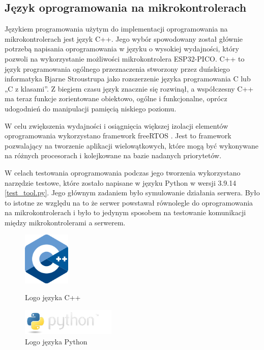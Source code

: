 \documentclass[12pt,oneside,a4paper]{book}
\theoremstyle{break}
\begin{document}
\subsection{Język oprogramowania na mikrokontrolerach}
Językiem programowania użytym do implementacji oprogramowania na mikrokontrolerach
jest język C++. Jego wybór spowodowany został głównie potrzebą napisania oprogramowania
w języku o wysokiej wydajności, który pozwoli na wykorzystanie możliwości mikrokontrolera
ESP32-PICO. C++ to język programowania ogólnego przeznaczenia stworzony przez duńskiego
informatyka Bjarne Stroustrupa jako rozszerzenie języka programowania C lub „C z klasami”. 
Z biegiem czasu język znacznie się rozwinął, a współczesny C++ ma teraz funkcje zorientowane
obiektowo, ogólne i funkcjonalne, oprócz udogodnień do manipulacji pamięcią niskiego poziomu.\\
\par W celu zwiększenia wydajności i osiągnięcia większej izolacji elementów oprogramowania
wykorzystano framework freeRTOS \cite{freeRTOS}. Jest to framework pozwalający na tworzenie
aplikacji wielowątkowych, które mogą być wykonywane na różnych procesorach i kolejkowane
na bazie nadanych priorytetów.\\
\par W celach testowania oprogramowania podczas jego tworzenia wykorzystano narzędzie testowe,
które zostało napisane w języku Python\cite{python} w wersji 3.9.14 \ref*{test_tool.py}. Jego głównym zadaniem było symulowanie działania
serwera. Było to istotne ze względu na to że serwer powstawał równolegle do oprogramowania na mikrokontrolerach i
było to jedynym sposobem na testowanie komunikacji między mikrokontrolerami a serwerem.

\begin{figure}[H]
    \begin{center}
        \includegraphics[width=0.20\textwidth]{cpp_logo.png}    
        \caption{Logo języka C++}
        \includegraphics[width=0.40\textwidth]{python-logo.png}    
        \caption{Logo języka Python}
    \end{center}
\end{figure}
\end{document}

